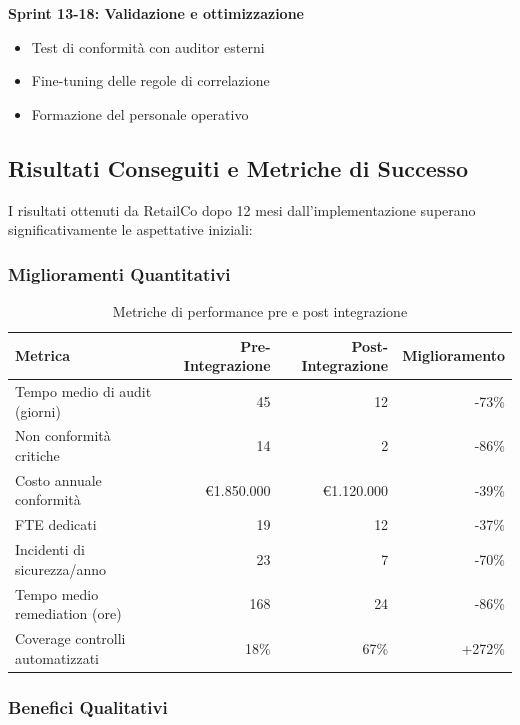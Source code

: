 \textbf{Sprint 13-18: Validazione e ottimizzazione}
\begin{itemize}
    \item Test di conformità con auditor esterni
    \item Fine-tuning delle regole di correlazione
    \item Formazione del personale operativo
\end{itemize}

\subsection{Risultati Conseguiti e Metriche di Successo}
\label{subsec:4.7.3_risultati}

I risultati ottenuti da RetailCo dopo 12 mesi dall'implementazione superano significativamente le aspettative iniziali:

\subsubsection{Miglioramenti Quantitativi}

\begin{table}[h]
\centering
\caption{Metriche di performance pre e post integrazione}
\label{tab:metriche_retailco}
\begin{tabular}{|l|r|r|r|}
\hline
\textbf{Metrica} & \textbf{Pre-Integrazione} & \textbf{Post-Integrazione} & \textbf{Miglioramento} \\
\hline
Tempo medio di audit (giorni) & 45 & 12 & -73\% \\
\hline
Non conformità critiche & 14 & 2 & -86\% \\
\hline
Costo annuale conformità & €1.850.000 & €1.120.000 & -39\% \\
\hline
FTE dedicati & 19 & 12 & -37\% \\
\hline
Incidenti di sicurezza/anno & 23 & 7 & -70\% \\
\hline
Tempo medio remediation (ore) & 168 & 24 & -86\% \\
\hline
Coverage controlli automatizzati & 18\% & 67\% & +272\% \\
\hline
\end{tabular}
\end{table}

\subsubsection{Benefici Qualitativi}

